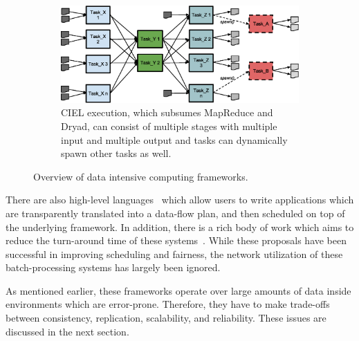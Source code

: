 \documentclass[a4paper,12pt,twoside,openright]{report}
\begin{document}
\begin{figure}[h!]
\begin{subfigure}[b]{0.8\textwidth}
                \centering
                \includegraphics[width=\textwidth]{CIEL.eps}
                \caption{CIEL
        execution, which subsumes MapReduce and Dryad, can consist of multiple
        stages with multiple input and multiple output and tasks can dynamically
        spawn other tasks as well.}
                \label{fig:ciel}
        \end{subfigure}
        \caption{Overview of data intensive computing frameworks.}
        \label{chap:intro:fig:frameworks}
\end{figure}

There are also high-level
languages~\cite{Olston:2008:PLN,Pike:2005:IDP,Murray:2010:SCS,Yu:2008:DSG} which
allow users to write applications which are transparently translated into a
data-flow plan, and then scheduled on top of the underlying framework. In
addition, there is a rich body of work which aims to reduce the turn-around time
of these systems~\cite{Zaharia:2010:DSS,Isard:2009:QFS,Zaharia:2008:IMP}. While
these proposals have been successful in improving scheduling and fairness, the
network utilization of these batch-processing systems has largely been ignored.

As mentioned earlier, these frameworks operate over large amounts of data inside
environments which are error-prone. Therefore, they have to make trade-offs
between consistency, replication, scalability, and reliability. These issues are
discussed in the next section.
\end{document}
